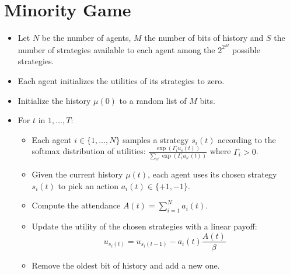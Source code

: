 \section*{Minority Game}

\begin{itemize}
    \item Let $N$ be the number of agents, $M$ the number of bits of history and $S$ the number of strategies available to each agent among the $2^{2^M}$ possible strategies. 
    \item Each agent initializes the utilities of its strategies to zero.
    \item Initialize the history $\mu(0)$ to a random list of $M$ bits.
    \item For $t$ in $1, ..., T$:
    \begin{itemize}
        \item Each agent $i \in \{1,\dots,N\}$ samples a strategy $s_i(t)$ according to the softmax distribution of utilities: $\frac{\exp(\Gamma_i u_s(t))}{\sum_{s'}\exp(\Gamma_i u_{s'}(t))}$ where $\Gamma_i > 0$.
        \item Given the current history $\mu(t)$, each agent uses its chosen strategy $s_i(t)$ to pick an action $a_i(t) \in \{+1, -1\}$.
        \item Compute the attendance $A(t) = \sum\limits_{i=1}^N a_i(t)$.
        \item Update the utility of the chosen strategies with a linear payoff: \[u_{s_i(t)} = u_{s_i(t-1)} - a_i(t) \frac{A(t)}{\beta}\]
        \item Remove the oldest bit of history and add a new one.
    \end{itemize}
\end{itemize}

